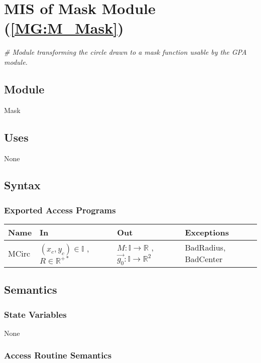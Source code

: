 \documentclass[12pt, titlepage]{article}
\begin{document}
\section{MIS of Mask Module (\texorpdfstring{\cref{MG:M_Mask}}))} 
\label{MIS_Mask}

\noindent\textit{{\#} Module transforming the circle drawn to a mask function 
usable by the GPA module.}


\subsection{Module}
Mask
\subsection{Uses}
None

\subsection{Syntax}

\subsubsection{Exported Access Programs}

\begin{center}
\begin{tabular}{p{2cm} p{4cm} p{5cm} p{3cm}}
\hline
\textbf{Name} & \textbf{In} & \textbf{Out} & \textbf{Exceptions} \\
\hline
MCirc & $(x_c,y_c) \in \mathbb{I}$ , $R \in \mathbb{R}^{+*}$ & 
$M:\mathbb{I}\rightarrow\mathbb{R}$ , $\overrightarrow{g_0} 
:\mathbb{I}\rightarrow\mathbb{R}^2$ & BadRadius, BadCenter\\
\hline
\end{tabular}
\end{center}

\subsection{Semantics}

\subsubsection{State Variables}
None

\subsubsection{Access Routine Semantics}
\end{document}
